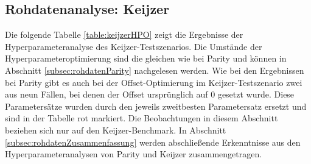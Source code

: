 \subsection{Rohdatenanalyse: Keijzer}
\label{subsec:rohdatenKeijzer}

Die folgende Tabelle \ref{table:keijzerHPO} zeigt die Ergebnisse der Hyperparameteranalyse des Keijzer-Test\-sze\-narios.
Die Umstände der Hyperparameteroptimierung sind die gleichen wie bei Parity und können in Abschnitt \ref{subsec:rohdatenParity} nachgelesen werden.
Wie bei den Ergebnissen bei Parity gibt es auch bei der Offset-Optimierung im Keijzer-Testszenario zwei aus neun Fällen, bei denen der Offset ursprünglich auf 0 gesetzt wurde.
Diese Parametersätze wurden durch den jeweils zweitbesten Parametersatz ersetzt und sind in der Tabelle rot markiert.
Die Beobachtungen in diesem Abschnitt beziehen sich nur auf den Keijzer-Benchmark.
In Abschnitt \ref{subsec:rohdatenZusammenfassung} werden abschließende Erkenntnisse aus den Hyperparameteranalysen von Parity und Keijzer zusammengetragen.

